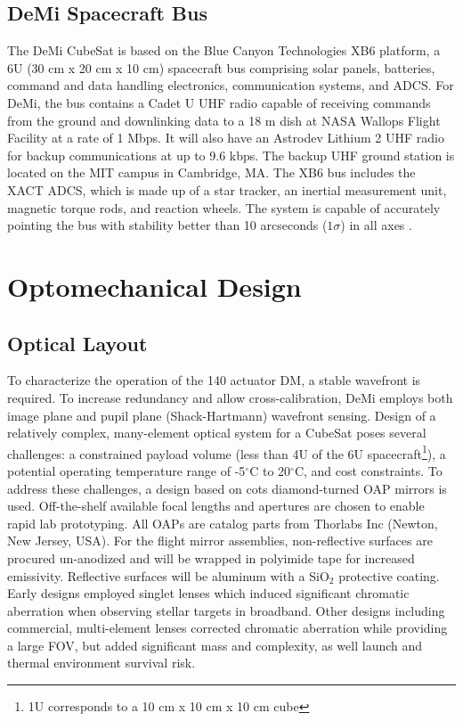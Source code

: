 \documentclass[]{spie}  %
\begin{document}
\subsection{DeMi Spacecraft Bus}
The DeMi CubeSat is based on the Blue Canyon Technologies XB6 platform, a 6U (30 cm x 20 cm x 10 cm) spacecraft bus comprising solar panels, batteries, command and data handling electronics, communication systems, and \gls{ADCS}.  For DeMi, the bus contains a Cadet U UHF radio capable of receiving commands from the ground and downlinking data to a 18 m dish at NASA Wallops Flight Facility at a rate of 1 Mbps. It will also have an Astrodev Lithium 2 UHF radio for backup communications at up to 9.6 kbps. The backup UHF ground station is located on the MIT campus in Cambridge, MA. The XB6 bus includes the XACT \gls{ADCS}, which is made up of a star tracker, an inertial measurement unit, magnetic torque rods, and reaction wheels. The system is capable of accurately pointing the bus with stability better than 10 arcseconds ($1\sigma$) in all axes \cite{mason_minxss_2017}. 

\section{Optomechanical Design}
\label{sec:optomech}
\subsection{Optical Layout} %
To characterize the operation of the 140 actuator \gls{DM}, a stable wavefront is required. 
To increase redundancy and allow cross-calibration, DeMi employs both image plane and pupil plane (Shack-Hartmann) wavefront sensing.  
Design of a relatively complex, many-element optical system for a CubeSat poses several challenges: a constrained payload volume (less than 4U of the 6U spacecraft\footnote{1U corresponds to a 10 cm x 10 cm x 10 cm cube}), a potential operating temperature range of -5$^\circ$C to 20$^\circ$C, and cost constraints.
To address  these challenges, a design based on \gls{cots} diamond-turned \gls{OAP}  mirrors is used. 
Off-the-shelf available focal lengths and apertures are chosen to enable rapid lab prototyping.
All \gls{OAP}s are catalog parts from Thorlabs Inc (Newton, New Jersey, USA). 
For the flight mirror assemblies, non-reflective surfaces are procured un-anodized and will be wrapped in polyimide tape for increased emissivity. 
Reflective surfaces will be aluminum with a SiO$_2$ protective coating.
Early designs\cite{marinan_improving_2016} employed singlet lenses which induced significant chromatic aberration when observing stellar targets in broadband.
Other designs including commercial, multi-element lenses\cite{douglas_design_2017-1}
corrected chromatic aberration while providing a large \gls{FOV},  but added significant mass and complexity, as well launch and thermal environment survival risk.
\end{document}
